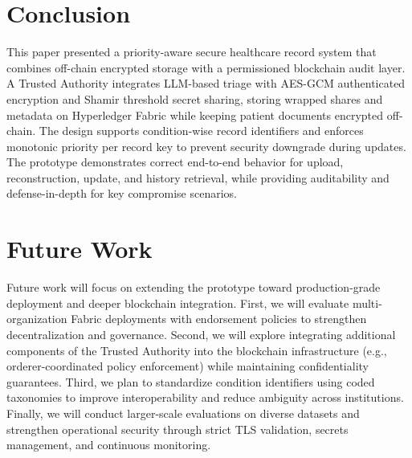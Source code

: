 \documentclass{IEEEtran}
\begin{document}
\section{Conclusion}
This paper presented a priority-aware secure healthcare record system that combines off-chain encrypted storage with a permissioned blockchain audit layer. A Trusted Authority integrates LLM-based triage with AES-GCM authenticated encryption and Shamir threshold secret sharing, storing wrapped shares and metadata on Hyperledger Fabric while keeping patient documents encrypted off-chain. The design supports condition-wise record identifiers and enforces monotonic priority per record key to prevent security downgrade during updates. The prototype demonstrates correct end-to-end behavior for upload, reconstruction, update, and history retrieval, while providing auditability and defense-in-depth for key compromise scenarios.

\section{Future Work}

Future work will focus on extending the prototype toward production-grade deployment and deeper blockchain integration. First, we will evaluate multi-organization Fabric deployments with endorsement policies to strengthen decentralization and governance. Second, we will explore integrating additional components of the Trusted Authority into the blockchain infrastructure (e.g., orderer-coordinated policy enforcement) while maintaining confidentiality guarantees. Third, we plan to standardize condition identifiers using coded taxonomies to improve interoperability and reduce ambiguity across institutions. Finally, we will conduct larger-scale evaluations on diverse datasets and strengthen operational security through strict TLS validation, secrets management, and continuous monitoring.
\end{document}
